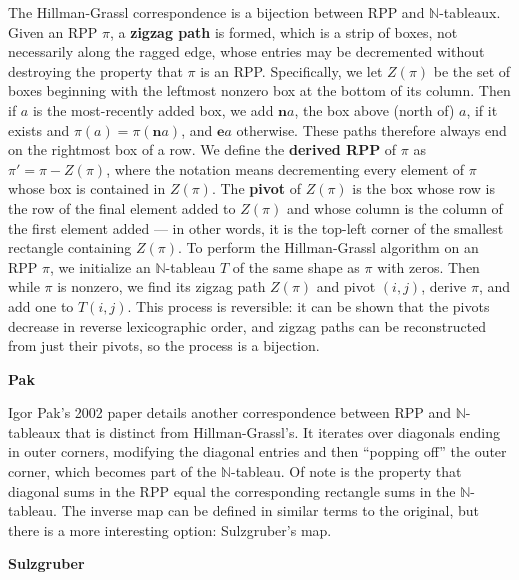 The Hillman-Grassl correspondence is a bijection between RPP and $\mathbb{N}$-tableaux. Given an RPP $\pi$, a \textbf{zigzag path} is formed, which is a strip of boxes, not necessarily along the ragged edge, whose entries may be decremented without destroying the property that $\pi$ is an RPP. Specifically, we let $Z(\pi)$ be the set of boxes beginning with the leftmost nonzero box at the bottom of its column. Then if $a$ is the most-recently added box, we add $\mathbf{n}a$, the box above (north of) $a$, if it exists and $\pi(a) = \pi(\mathbf{n}a)$, and $\mathbf{e}a$ otherwise. These paths therefore always end on the rightmost box of a row. We define the \textbf{derived RPP} of $\pi$ as $\pi' = \pi - Z(\pi)$, where the notation means decrementing every element of $\pi$ whose box is contained in $Z(\pi)$. The \textbf{pivot} of $Z(\pi)$ is the box whose row is the row of the final element added to $Z(\pi)$ and whose column is the column of the first element added --- in other words, it is the top-left corner of the smallest rectangle containing $Z(\pi)$. To perform the Hillman-Grassl algorithm on an RPP $\pi$, we initialize an $\mathbb{N}$-tableau $T$ of the same shape as $\pi$ with zeros. Then while $\pi$ is nonzero, we find its zigzag path $Z(\pi)$ and pivot $(i, j)$, derive $\pi$, and add one to $T(i, j)$. This process is reversible: it can be shown that the pivots decrease in reverse lexicographic order, and zigzag paths can be reconstructed from just their pivots, so the process is a bijection.



\vspace{.25in}

\Large \textbf{Pak}\\

\normalsize

Igor Pak's 2002 paper details another correspondence between RPP and $\mathbb{N}$-tableaux that is distinct from Hillman-Grassl's. It iterates over diagonals ending in outer corners, modifying the diagonal entries and then ``popping off'' the outer corner, which becomes part of the $\mathbb{N}$-tableau. Of note is the property that diagonal sums in the RPP equal the corresponding rectangle sums in the $\mathbb{N}$-tableau. The inverse map can be defined in similar terms to the original, but there is a more interesting option: Sulzgruber's map.



\vspace{.25in}

\Large \textbf{Sulzgruber}\\

